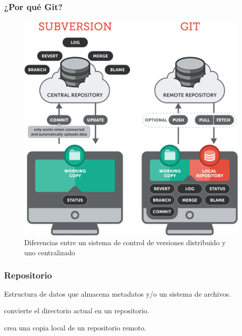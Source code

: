 \documentclass{beamer}
\begin{document}
\begin{frame}
  \frametitle{{\FiraTitle \textbf{¿Por qué Git?}}}
  \begin{figure}
    \centering
    \includegraphics[scale=0.2]{centralizado-vs-distribuido}
    \caption{Diferencias entre un sistema de control de versiones distribuido y uno centralizado}
  \end{figure}
\end{frame}

\begin{frame}
  \frametitle{{\FiraTitle \textbf{Repositorio}}}
  Estructura de datos que almacena metadatos y/o un sistema de archivos.

  \vspace{2em}

  \colorbox{purple}{\color{white}{\lstinline|git init|}} convierte el directorio actual en un repositorio.

  \vspace{1em}

  \colorbox{purple}{\color{white}{\lstinline°git clone <http|ftp|ssh>°}} crea una copia local de un repositorio remoto.
\end{frame}

\begin{frame}
  \begin{center}
    \resizebox{\textwidth}{!}{\FiraTitle \color{green}{git status}}
    \resizebox{0.7\textwidth}{!}{\FiraTitle \color{purple}{git log}}
  \end{center}
\end{frame}
\end{document}
